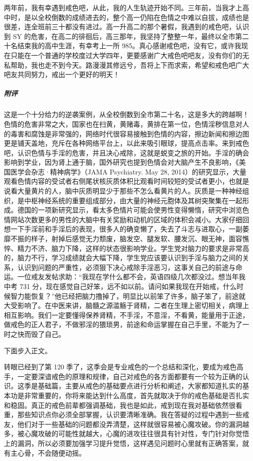 \begin{case}
    两年前，我有幸遇到戒色吧，从此，我的人生轨迹开始不同。三年前，当我才上高中时，是以全校倒数的成绩进去的，整个高一仍陷在色情之中难以自拔，成绩也是很差，连全班前三十都没有进过。高一升高二的那个暑假，我遇到的戒色吧，认识到 SY 的危害，在高二的徘徊后，高三那年，我坚持了整整一年，最终以全市第二十名结束我的高中生涯，有幸考上一所 985。真心感谢戒色吧，没有它，或许我现在只能在一个普通的学校度过大学四年，更要感谢广大戒色吧吧友，没有你们的无私帮助，我也走不到今天。路漫漫其修远兮，吾将上下而求索，希望和戒色吧广大吧友共同努力，戒出一个更好的明天！
    \subparagraph{附评} 这是一个十分给力的逆袭案例，从全校倒数到全市第二十名，这是多大的跨越啊！色情的危害非常之大，国家也在扫黄，黄赌毒，黄排在第一位，色情淫秽信息对人的毒害和腐蚀是非常强的，网络时代很容易接触到色情的内容，擦边新闻和擦边图更是铺天盖地，充斥在各种网络平台上，以此来吸引眼球，提高点击率。来到戒色吧，认识色情与手淫的危害，并且决心戒除，这就是蜕变之旅的开始。手淫的确会影响到学业，因为肾上通于脑，国外研究也提到色情会对大脑产生不良影响，《美国医学会杂志·精神病学》（JAMA Psychiatry. May 28, 2014）的研究显示，大量观看色情内容的受试者右侧尾状核灰质体积比观看时间较短的受试者更小，也就是说看大量黄片的人，脑中灰质明显少于那些不怎么看黄片的人。灰质是一种神经组织，是中枢神经系统的重要组成部分，由大量的神经元胞体及其树突聚集在一起形成。德国的一项新研究显示，看太多色情片可能会使男性变得懒惰，研究中浏览色情网站次数更多的男性的大脑中有关奖励和动机的区域的体积会减小。大家仔细回想一下手淫前和手淫后的表现，很多人的确变懒了，失去了斗志与进取心，一副萎靡不振的样子，射掉后感觉无力颓废，脑发空、腿发软、腰发沉、眼无神，面容憔悴、精力不济、脑力下降，这样的状态很影响学业。学生党对脑力的要求是非常高的，脑力不行，学习成绩就会大幅下降，学生党应该要认识到手淫与脑力之间的关系，认识到问题的严重性，必须狠下决心戒除手淫恶习，这事关自己的前途与命运。一位戒友发帖求助：“我现在学什么都不会，英语四级几次都没过。想当年我中考 731 分，现在感觉自己好笨，远不如以前。请问如果我现在开始戒，什么时候智力能恢复？”他已经把脑力撸掉了，明显比以前笨了许多，脑子笨了，前途就大受影响了。在中医来讲，脑髓之源滥觞于肾精，二者在生理上密切相关，病理上相互影响。我们一定要懂得保养肾精，不手淫，不意淫，不看黄，能量用于正途，做戒色的正人君子，不做邪淫的猥琐男，前途和命运掌握在自己手里，不能为了一时之快而毁了自己。
\end{case}

下面步入正文。

转眼已经到了第 120 季了，这季会是专业戒色的一个总结和深化，要成为戒色高手，一定要深谙戒色的原理和规律，自己对戒色的各方面都要有一个较为正确的认识。这季是基础篇，主要从戒色的基础要点进行分析和阐述，大家都知道扎实的基本功是非常重要的，你将来能达到什么高度，首先就取决于你的戒色基础是否扎实和稳固。真正的戒色前辈都强调基础，我也是如此，戒到现在我对基础依然很看重，那些知识点你必须全部掌握，认识要清晰准确。我在答疑的过程中遇到一些戒友，他们对于一些基础的问题都没弄清楚，这样就很容易被心魔攻破。你的漏洞越多，被心魔攻破的可能性就越大，心魔的进攻往往很具有针对性，专门针对你觉悟上的漏洞，所以必须要加强学习提升觉悟，这样遇见问题时心里就有正确答案，就有主心骨，不会随便动摇。


